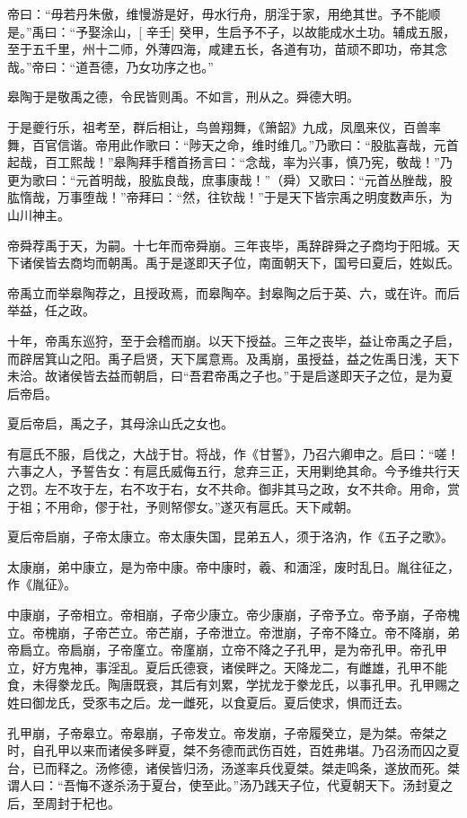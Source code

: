 \documentclass[UTF8,12pt,AutoFakeBold]{ctexart}
\begin{document}
帝曰：“毋若丹朱傲，维慢游是好，毋水行舟，朋淫于家，用绝其世。予不能顺是。”禹曰：“予娶涂山，[ 辛壬] 癸甲，生启予不子，以故能成水土功。辅成五服，至于五千里，州十二师，外薄四海，咸建五长，各道有功，苗顽不即功，帝其念哉。”帝曰：“道吾德，乃女功序之也。”

皋陶于是敬禹之德，令民皆则禹。不如言，刑从之。舜德大明。

于是夔行乐，祖考至，群后相让，鸟兽翔舞，《箫韶》九成，凤凰来仪，百兽率舞，百官信谐。帝用此作歌曰：“陟天之命，维时维几。”乃歌曰：“股肱喜哉，元首起哉，百工熙哉！”皋陶拜手稽首扬言曰：“念哉，率为兴事，慎乃宪，敬哉！”乃更为歌曰：“元首明哉，股肱良哉，庶事康哉！”（舜）又歌曰：“元首丛脞哉，股肱惰哉，万事堕哉！”帝拜曰：“然，往钦哉！”于是天下皆宗禹之明度数声乐，为山川神主。

帝舜荐禹于天，为嗣。十七年而帝舜崩。三年丧毕，禹辞辟舜之子商均于阳城。天下诸侯皆去商均而朝禹。禹于是遂即天子位，南面朝天下，国号曰夏后，姓姒氏。

帝禹立而举皋陶荐之，且授政焉，而皋陶卒。封皋陶之后于英、六，或在许。而后举益，任之政。

十年，帝禹东巡狩，至于会稽而崩。以天下授益。三年之丧毕，益让帝禹之子启，而辟居箕山之阳。禹子启贤，天下属意焉。及禹崩，虽授益，益之佐禹日浅，天下未洽。故诸侯皆去益而朝启，曰“吾君帝禹之子也。”于是启遂即天子之位，是为夏后帝启。

夏后帝启，禹之子，其母涂山氏之女也。

有扈氏不服，启伐之，大战于甘。将战，作《甘誓》，乃召六卿申之。启曰：“嗟！六事之人，予誓告女：有扈氏威侮五行，怠弃三正，天用剿绝其命。今予维共行天之罚。左不攻于左，右不攻于右，女不共命。御非其马之政，女不共命。用命，赏于祖；不用命，僇于社，予则帑僇女。”遂灭有扈氏。天下咸朝。

夏后帝启崩，子帝太康立。帝太康失国，昆弟五人，须于洛汭，作《五子之歌》。

太康崩，弟中康立，是为帝中康。帝中康时，羲、和湎淫，废时乱日。胤往征之，作《胤征》。

中康崩，子帝相立。帝相崩，子帝少康立。帝少康崩，子帝予立。帝予崩，子帝槐立。帝槐崩，子帝芒立。帝芒崩，子帝泄立。帝泄崩，子帝不降立。帝不降崩，弟帝扃立。帝扃崩，子帝廑立。帝廑崩，立帝不降之子孔甲，是为帝孔甲。帝孔甲立，好方鬼神，事淫乱。夏后氏德衰，诸侯畔之。天降龙二，有雌雄，孔甲不能食，未得豢龙氏。陶唐既衰，其后有刘累，学扰龙于豢龙氏，以事孔甲。孔甲赐之姓曰御龙氏，受豕韦之后。龙一雌死，以食夏后。夏后使求，惧而迁去。

孔甲崩，子帝皋立。帝皋崩，子帝发立。帝发崩，子帝履癸立，是为桀。帝桀之时，自孔甲以来而诸侯多畔夏，桀不务德而武伤百姓，百姓弗堪。乃召汤而囚之夏台，已而释之。汤修德，诸侯皆归汤，汤遂率兵伐夏桀。桀走鸣条，遂放而死。桀谓人曰：“吾悔不遂杀汤于夏台，使至此。”汤乃践天子位，代夏朝天下。汤封夏之后，至周封于杞也。
\end{document}
